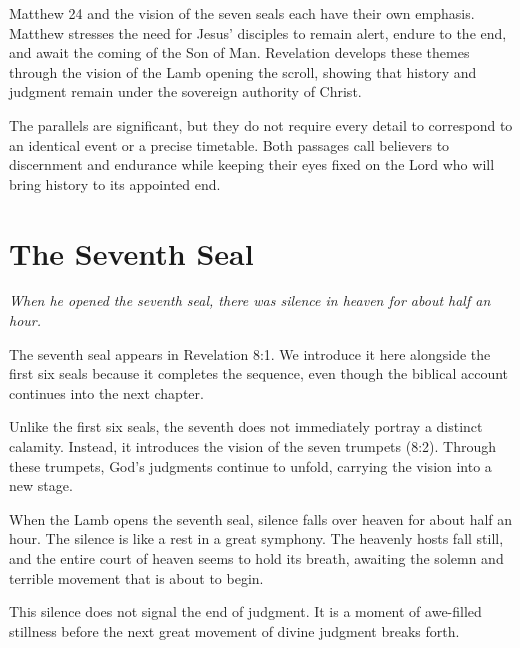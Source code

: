 Matthew 24 and the vision of the seven seals each have their own emphasis. Matthew stresses the need for Jesus' disciples to remain alert, endure to the end, and await the coming of the Son of Man. Revelation develops these themes through the vision of the Lamb opening the scroll, showing that history and judgment remain under the sovereign authority of Christ.

The parallels are significant, but they do not require every detail to correspond to an identical event or a precise timetable. Both passages call believers to discernment and endurance while keeping their eyes fixed on the Lord who will bring history to its appointed end.

\section{The Seventh Seal}


\begin{ScriptureBox2}
\item[8:1] \textit{When he opened the seventh seal, there was silence in heaven for about half an hour.}
\end{ScriptureBox2}

The seventh seal appears in Revelation 8:1. We introduce it here alongside the first six seals because it completes the sequence, even though the biblical account continues into the next chapter.

Unlike the first six seals, the seventh does not immediately portray a distinct calamity. Instead, it introduces the vision of the seven trumpets (8:2). Through these trumpets, God's judgments continue to unfold, carrying the vision into a new stage.

When the Lamb opens the seventh seal, silence falls over heaven for about half an hour. The silence is like a rest in a great symphony. The heavenly hosts fall still, and the entire court of heaven seems to hold its breath, awaiting the solemn and terrible movement that is about to begin.

This silence does not signal the end of judgment. It is a moment of awe-filled stillness before the next great movement of divine judgment breaks forth.

